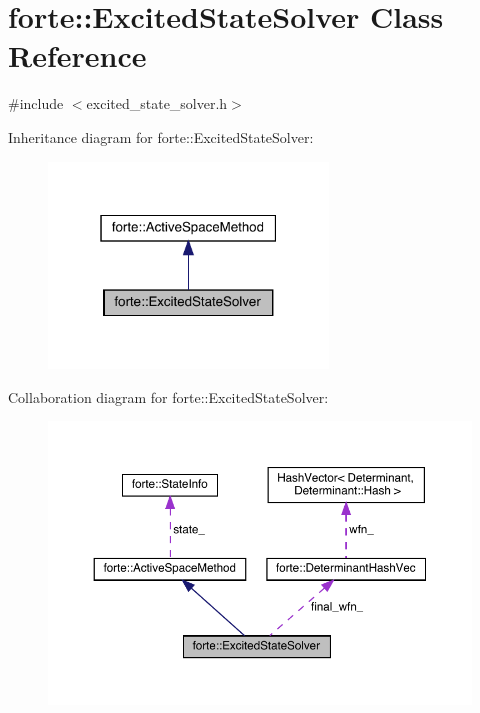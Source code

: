 \hypertarget{classforte_1_1_excited_state_solver}{}\section{forte\+:\+:Excited\+State\+Solver Class Reference}
\label{classforte_1_1_excited_state_solver}


{\ttfamily \#include $<$excited\+\_\+state\+\_\+solver.\+h$>$}



Inheritance diagram for forte\+:\+:Excited\+State\+Solver\+:
\nopagebreak
\begin{figure}[H]
\begin{center}
\leavevmode
\includegraphics[width=211pt]{classforte_1_1_excited_state_solver__inherit__graph}
\end{center}
\end{figure}


Collaboration diagram for forte\+:\+:Excited\+State\+Solver\+:
\nopagebreak
\begin{figure}[H]
\begin{center}
\leavevmode
\includegraphics[width=350pt]{classforte_1_1_excited_state_solver__coll__graph}
\end{center}
\end{figure}

